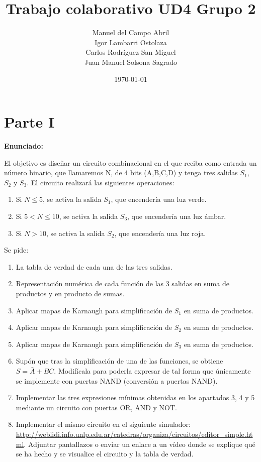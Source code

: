 \documentclass[11pt,a4paper]{article}
\title{Trabajo colaborativo UD4 Grupo 2}
\author{Manuel del Campo Abril\\Igor Lambarri Ostolaza\\Carlos Rodríguez San Miguel\\Juan Manuel Solsona Sagrado}
\date{\today}
\begin{document}
\maketitle


\tableofcontents
\newpage

\listoffigures
\newpage

\setcounter{page}{1}

\section{Parte I}

\textbf{Enunciado:}

El objetivo es diseñar un circuito combinacional en el que reciba como entrada un número binario, que llamaremos N, de 4 bits (A,B,C,D) y tenga tres salidas $S_1$, $S_2$ y $S_3$. El circuito realizará las siguientes operaciones:
\begin{enumerate}
    \item Si $N \leq 5$, se activa la salida $S_1$, que encendería una luz verde.
    \item Si $5 < N \leq 10$, se activa la salida $S_3$, que encendería una luz ámbar.
    \item Si $N > 10$, se activa la salida $S_2$, que encendería una luz roja.
\end{enumerate}

Se pide:
\begin{enumerate}
    \item La tabla de verdad de cada una de las tres salidas.
    \item Representación numérica de cada función de las 3 salidas en suma de productos y en producto de sumas.
    \item Aplicar mapas de Karnaugh para simplificación de $S_1$ en suma de productos.
    \item Aplicar mapas de Karnaugh para simplificación de $S_2$ en suma de productos.
    \item Aplicar mapas de Karnaugh para simplificación de $S_3$ en suma de productos.
    \item Supón que tras la simplificación de una de las funciones, se obtiene $S=\bar{A}+BC$. Modifícala para poderla expresar de tal forma que únicamente se implemente con puertas NAND (conversión a puertas NAND).
    \item Implementar las tres expresiones mínimas obtenidas en los apartados 3, 4 y 5 mediante un circuito con puertas OR, AND y NOT.
    \item Implementar el mismo circuito en el siguiente simulador: \url{http://weblidi.info.unlp.edu.ar/catedras/organiza/circuitos/editor_simple.html}. Adjuntar pantallazos o enviar un enlace a un vídeo donde se explique qué se ha hecho y se visualice el circuito y la tabla de verdad.
\end{enumerate}
\end{document}
